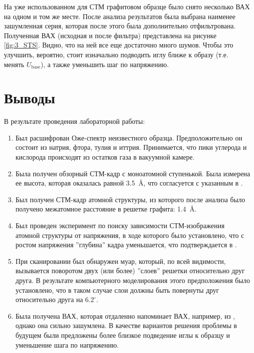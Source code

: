 \documentclass[a4paper, 12pt]{article}
\begin{document}
	На уже использованном для СТМ графитовом образце было снято несколько ВАХ на одном и том же месте. После анализа результатов была выбрана наименее зашумленная серия, которая после этого была дополнительно отфильтрована. Полученная ВАХ (исходная и после фильтра) представлена на рисунке \ref{fig:3_STS}. Видно, что на ней все еще достаточно много шумов. Чтобы это улучшить, вероятно, стоит изначально подводить иглу ближе к образу (т.е. менять $U_{\text{base}}$), а также уменьшить шаг по напряжению.
	
	\section{Выводы}
	
	В результате проведения лабораторной работы:
	
	\begin{enumerate}
		\item Был расшифрован Оже-спектр неизвестного образца. Предположительно он состоит из натрия, фтора, тулия и иттрия. Принимается, что пики углерода и кислорода происходят из остатков газа в вакуумной камере.
		
		\item Была получен обзорный СТМ-кадр с моноатомной ступенькой. Была измерена ее высота, которая оказалась равной 3.5~\AA, что согласуется с указанным в \cite{Article}.
		
		\item Был получен СТМ-кадр атомной структуры, из которого после анализа было получено межатомное расстояние в решетке графита: 1.4~\AA.
		
		\item Был проведен эксперимент по поиску зависимости СТМ-изображения атомной структуры от напряжения, в ходе которого было установлено, что с ростом напряжения ''глубина'' кадра уменьшается, что подтверждается в \cite{STM_Binnig}.
		
		\item При сканировании был обнаружен муар, который, по всей видимости, вызывается поворотом двух (или более) ''слоев'' решетки относительно друг друга. В результате компьютерного моделирования этого предположения было установлено, что в таком случае слои должны быть повернуты друг относительно друга на $6.2^\circ$.
		
		\item Была получена ВАХ, которая отдаленно напоминает ВАХ, например, из \cite{Article}, однако она сильно зашумлена. В качестве вариантов решения проблемы в будущем были предложены более близкое подведение иглы к образцу и уменьшение шага по напряжению.
	\end{enumerate}
	
\end{document}

